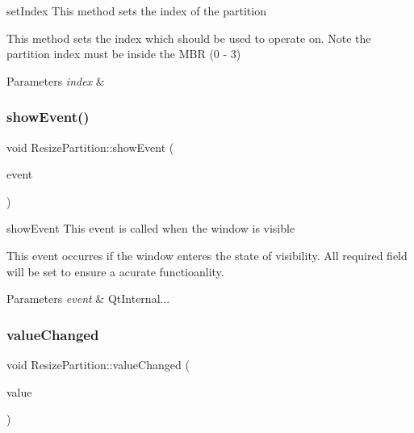 set\+Index This method sets the index of the partition 

This method sets the index which should be used to operate on. Note the partition index must be inside the M\+BR (0 -\/ 3) 
\begin{DoxyParams}{Parameters}
{\em index} & \\
\hline
\end{DoxyParams}
\mbox{\label{class_resize_partition_a3a220945008ce93de147fdf3d8faf486}} 
\subsubsection{\texorpdfstring{show\+Event()}{showEvent()}}
{\footnotesize\ttfamily void Resize\+Partition\+::show\+Event (\begin{DoxyParamCaption}\item[{Q\+Show\+Event $\ast$}]{event }\end{DoxyParamCaption})\hspace{0.3cm}{\ttfamily [override]}}



show\+Event This event is called when the window is visible 

This event occurres if the window enteres the state of visibility. All required field will be set to ensure a acurate functioanlity. 
\begin{DoxyParams}{Parameters}
{\em event} & Qt\+Internal... \\
\hline
\end{DoxyParams}
\mbox{\label{class_resize_partition_a6cdad6be2f435ad46bcf0b537b062a40}} 
\subsubsection{\texorpdfstring{value\+Changed}{valueChanged}}
{\footnotesize\ttfamily void Resize\+Partition\+::value\+Changed (\begin{DoxyParamCaption}\item[{int}]{value }\end{DoxyParamCaption})\hspace{0.3cm}{\ttfamily [slot]}}



